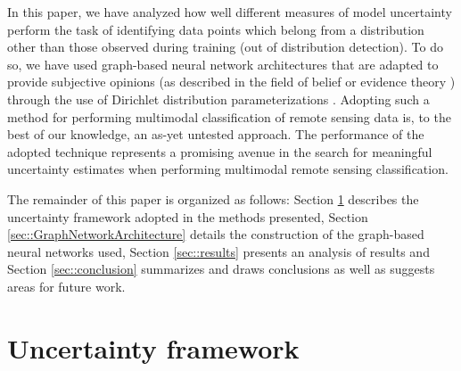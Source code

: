 \documentclass[
twocolumn,
]{ceurart}
\begin{document}
In this paper, we have analyzed how well different measures of model uncertainty perform the task of identifying data points which belong from a distribution other than those observed during training (out of distribution detection).
To do so, we have used graph-based neural network architectures that are adapted to provide subjective opinions (as described in the field of belief or evidence theory \cite{Josang2018}) through the use of Dirichlet distribution parameterizations \cite{Kipf2017, ZhaoXujiang2020}.
Adopting such a method for performing multimodal classification of remote sensing data is, to the best of our knowledge, an as-yet untested approach.
The performance of the adopted technique represents a promising avenue in the search for meaningful uncertainty estimates when performing multimodal remote sensing classification.

The remainder of this paper is organized as follows: Section \ref{sec::unc_framework} describes the uncertainty framework adopted in the methods presented, Section \ref{sec::GraphNetworkArchitecture} details the construction of the graph-based neural networks used, Section \ref{sec::results} presents an analysis of results and Section \ref{sec::conclusion} summarizes and draws conclusions as well as suggests areas for future work.

\section{Uncertainty framework}
\label{sec::unc_framework}

\end{document}
